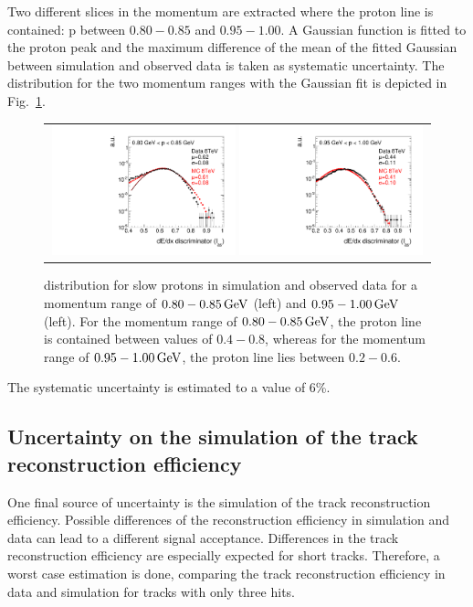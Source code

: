 Two different slices in the momentum are extracted where the proton line is contained: p between $0.80-0.85$ and $0.95-1.00$.
A Gaussian function is fitted to the proton peak and the maximum difference of the mean of the fitted Gaussian between simulation and observed data is taken as systematic uncertainty.
The \ias distribution for the two momentum ranges with the Gaussian fit is depicted in Fig.~\ref{fig:IasSlowProtons}.
\begin{figure}[!h]
  \centering 
  \begin{tabular}{c}
    \includegraphics[width=0.49\textwidth]{figures/analysis/Interpretation/hIas_analysis_2015_11_30_ForThesis_ptmin0p80_ptmax0p85.pdf} 
    \includegraphics[width=0.49\textwidth]{figures/analysis/Interpretation/hIas_analysis_2015_11_30_ForThesis_ptmin0p95_ptmax1p0.pdf}
  \end{tabular}
  \caption{\ias distribution for slow protons in simulation and observed data for a momentum range of $0.80-0.85\,\text{Ge}\kern-0.06667em\text{V}$ (left) and $0.95-1.00\,\text{Ge}\kern-0.06667em\text{V}$ (left).
           For the momentum range of $0.80-0.85\,\text{Ge}\kern-0.06667em\text{V}$, the proton line is contained between \ias values of $0.4-0.8$, whereas for the momentum range of $0.95-1.00\,\text{Ge}\kern-0.06667em\text{V}$, the proton line \ias lies between $0.2-0.6$.  }
  \label{fig:IasSlowProtons}
\end{figure} 
The systematic uncertainty is estimated to a value of 6\%.


\subsection*{Uncertainty on the simulation of the track reconstruction efficiency}
One final source of uncertainty is the simulation of the track reconstruction efficiency.
Possible differences of the reconstruction efficiency in simulation and data can lead to a different signal acceptance.
Differences in the track reconstruction efficiency are especially expected for short tracks.
Therefore, a worst case estimation is done, comparing the track reconstruction efficiency in data and simulation for tracks with only three hits.

